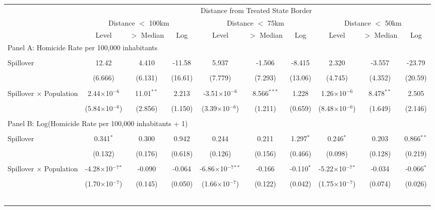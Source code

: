 \documentclass{article}
\begin{document}
\begin{table}[htbp]
\begin{adjustbox}{width=\textwidth}
\small
\begin{tabular}{lccccccccc}
\toprule
& \multicolumn{9}{c}{Distance from Treated State Border} \\
\cmidrule(lr){2-10}
& \multicolumn{3}{c}{Distance $<$ 100km} & \multicolumn{3}{c}{Distance $<$ 75km} & \multicolumn{3}{c}{Distance $<$ 50km} \\
\cmidrule(lr){2-4} \cmidrule(lr){5-7} \cmidrule(lr){8-10}
& Level & $>$ Median & Log & Level & $>$ Median & Log & Level & $>$ Median & Log \\
\midrule
\multicolumn{10}{l}{Panel A: Homicide Rate per 100,000 inhabitants} \\\\
Spillover & 12.42 & 4.410 & -11.58 & 5.937 & -1.506 & -8.415 & 2.320 & -3.557 & -23.79 \\\\
 & (6.666) & (6.131) & (16.61) & (7.779) & (7.293) & (13.06) & (4.745) & (4.352) & (20.59) \\\\
Spillover $\times$ Population & 2.44$\times$10$^{-6}$ & 11.01$^{**}$ & 2.213 & -3.51$\times$10$^{-6}$ & 8.566$^{***}$ & 1.228 & 1.26$\times$10$^{-6}$ & 8.478$^{**}$ & 2.505 \\\\
 & (5.84$\times$10$^{-6}$) & (2.856) & (1.150) & (3.39$\times$10$^{-6}$) & (1.211) & (0.659) & (8.48$\times$10$^{-6}$) & (1.649) & (2.146) \\\\
\midrule
\multicolumn{10}{l}{Panel B: Log(Homicide Rate per 100,000 inhabitants + 1)} \\\\
Spillover & 0.341$^{*}$ & 0.300 & 0.942 & 0.244 & 0.211 & 1.297$^{*}$ & 0.246$^{*}$ & 0.203 & 0.866$^{**}$ \\\\
 & (0.132) & (0.176) & (0.618) & (0.126) & (0.156) & (0.466) & (0.098) & (0.128) & (0.219) \\\\
Spillover $\times$ Population & -4.28$\times$10$^{-7}$$^{*}$ & -0.090 & -0.064 & -6.86$\times$10$^{-7}$$^{**}$ & -0.166 & -0.110$^{*}$ & -5.22$\times$10$^{-7}$$^{*}$ & -0.034 & -0.066$^{*}$ \\\\
 & (1.70$\times$10$^{-7}$) & (0.145) & (0.050) & (1.66$\times$10$^{-7}$) & (0.122) & (0.042) & (1.75$\times$10$^{-7}$) & (0.074) & (0.026) \\\\
$$
\end{tabular}
\end{adjustbox}
\end{table}
\end{document}
